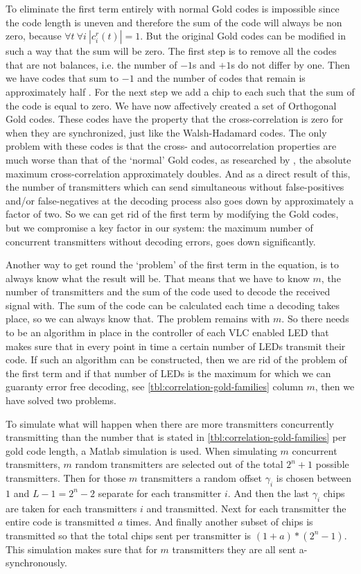 		To eliminate the first term entirely with normal Gold codes is impossible since the code length is uneven and therefore the sum of the code will always be non zero, because $\forall t \ \forall i \  | c^r_i(t) | = 1$.
		But the original Gold codes can be modified in such a way that the sum will be zero. 
		The first step is to remove all the codes that are not balances, i.e. the number of $-1$s and $+1$s do not differ by one.
		Then we have codes that sum to $-1$ and the number of codes that remain is approximately half \cite{holmes2007spread}.
		For the next step we add a chip to each such that the sum of the code is equal to zero.
		We have now affectively created a set of Orthogonal Gold codes.
		These codes have the property that the cross-correlation is zero for when they are synchronized, just like the Walsh-Hadamard codes.
		The only problem with these codes is that the cross- and autocorrelation properties are much worse than that of the `normal' Gold codes, as researched by \cite{5422934}, the absolute maximum cross-correlation approximately doubles.
		And as a direct result of this, the number of transmitters which can send simultaneous without false-positives and/or false-negatives at the decoding process also goes down by approximately a factor of two.
		So we can get rid of the first term by modifying the Gold codes, but we compromise a key factor in our system: the maximum number of concurrent transmitters without decoding errors, goes down significantly.

		Another way to get round the `problem' of the first term in the equation, is to always know what the result will be.
		That means that we have to know $m$, the number of transmitters and the sum of the code used to decode the received signal with.
		The sum of the code can be calculated each time a decoding takes place, so we can always know that.
		The problem remains with $m$. 
		So there needs to be an algorithm in place in the controller of each VLC enabled LED that makes sure that in every point in time a certain number of LEDs transmit their code.
		If such an algorithm can be constructed, then we are rid of the problem of the first term and if that number of LEDs is the maximum for which we can guaranty error free decoding, see \autoref{tbl:correlation-gold-families} column $m$, then we have solved two problems.


		To simulate what will happen when there are more transmitters concurrently transmitting than the number that is stated in \autoref{tbl:correlation-gold-families} per gold code length, a Matlab simulation is used.
		When simulating $m$ concurrent transmitters, $m$ random transmitters are selected out of the total $2^n + 1$ possible transmitters.
		Then for those $m$ transmitters a random offset $\gamma_i$ is chosen between $1$ and $L - 1 = 2^n - 2$ separate for each transmitter $i$.
		And then the last $\gamma_i$ chips are taken for each transmitters $i$ and transmitted.
		Next for each transmitter the entire code is transmitted $a$ times.
		And finally another subset of chips is transmitted so that the total chips sent per transmitter is $(1 + a) * (2^n - 1)$.
		This simulation makes sure that for $m$ transmitters they are all sent a-synchronously.

